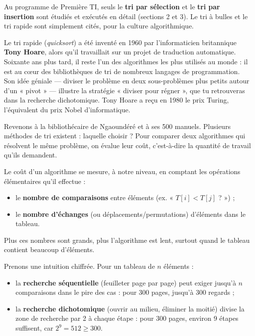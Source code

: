 \documentclass[11pt]{article}
\newcommand{\cle}[1]{{\popxbold\color{popdark}#1}}
\newcounter{popsec}
\newcounter{popsub}
\newcommand{\courssub}[1]{%
  \stepcounter{popsub}%
  \par\vspace{9pt}\noindent{\popxbold\fontsize{11.5}{13}\selectfont\color{popink}{\color{poporange}\thepopsec.\thepopsub}\hspace{6pt}#1}\par\nopagebreak\vspace{4pt}
}
\begin{document}
Au programme de Première TI, seuls le \textbf{tri par sélection} et le \textbf{tri par insertion} sont étudiés et exécutés en détail (sections 2 et 3). Le tri à bulles et le tri rapide sont simplement cités, pour la culture algorithmique.

\begin{savaistu}
Le \cle{tri rapide} (\emph{quicksort}) a été inventé en 1960 par l'informaticien britannique \textbf{Tony Hoare}, alors qu'il travaillait sur un projet de traduction automatique. Soixante ans plus tard, il reste l'un des algorithmes les plus utilisés au monde : il est au cœur des bibliothèques de tri de nombreux langages de programmation. Son idée géniale — diviser le problème en deux sous-problèmes plus petits autour d'un « pivot » — illustre la stratégie « diviser pour régner », que tu retrouveras dans la recherche dichotomique. Tony Hoare a reçu en 1980 le prix Turing, l'équivalent du prix Nobel d'informatique.
\end{savaistu}

\courssub{La notion de coût d'un algorithme}

Revenons à la bibliothécaire de Ngaoundéré et à ses 500 manuels. Plusieurs méthodes de tri existent : laquelle choisir ? Pour comparer deux algorithmes qui résolvent le même problème, on évalue leur \cle{coût}, c'est-à-dire la quantité de travail qu'ils demandent.

\begin{definition}
Le \cle{coût} d'un algorithme se mesure, à notre niveau, en comptant les opérations élémentaires qu'il effectue :
\begin{itemize}
  \item le \textbf{nombre de comparaisons} entre éléments (ex. « $T[i] < T[j]$ ? ») ;
  \item le \textbf{nombre d'échanges} (ou déplacements/permutations) d'éléments dans le tableau.
\end{itemize}
Plus ces nombres sont grands, plus l'algorithme est lent, surtout quand le tableau contient beaucoup d'éléments.
\end{definition}

Prenons une intuition chiffrée. Pour un tableau de $n$ éléments :
\begin{itemize}
  \item la \textbf{recherche séquentielle} (feuilleter page par page) peut exiger jusqu'à $n$ comparaisons dans le pire des cas : pour 300 pages, jusqu'à 300 regards ;
  \item la \textbf{recherche dichotomique} (ouvrir au milieu, éliminer la moitié) divise la zone de recherche par 2 à chaque étape : pour 300 pages, environ 9 étapes suffisent, car $2^9 = 512 \geq 300$.
\end{itemize}
\end{document}
